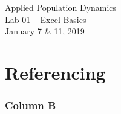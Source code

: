 \documentclass[color=usenames,dvipsnames]{beamer}
\begin{document}
\fboxsep=0mm

\begin{frame}[plain]
  \huge
  \begin{center}
    \huge Applied Population Dynamics \\
    \LARGE Lab 01 -- Excel Basics \\
    \large January 7 \& 11, 2019 \par
    \vspace{.5cm}
  \end{center}
\end{frame}


\section{Referencing}


\begin{frame}
  \frametitle{Column B}
\end{frame}
\end{document}
